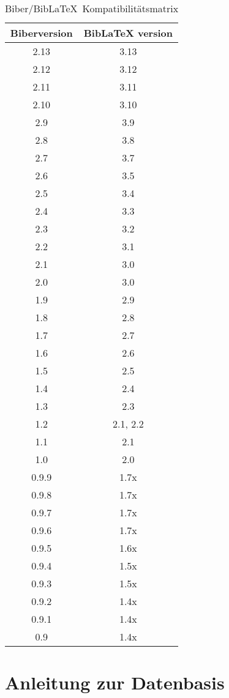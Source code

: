 \documentclass{ltxdockit}[2011/03/25]
\newcommand*{\biber}{Biber\xspace}
\newcommand*{\biblatex}{BibLaTeX\xspace}
\begin{document}
\begin{table}
\tablesetup\centering
\begin{tabular}{cc}
\toprule
\sffamily\bfseries\spotcolor Biberversion
  & \sffamily\bfseries\spotcolor \biblatex version\\
\midrule
2.13 & 3.13\\
2.12 & 3.12\\
2.11 & 3.11\\
2.10 & 3.10\\
2.9 & 3.9\\
2.8 & 3.8\\
2.7 & 3.7\\
2.6 & 3.5\\
2.5 & 3.4\\
2.4 & 3.3\\
2.3 & 3.2\\
2.2 & 3.1\\
2.1 & 3.0\\
2.0 & 3.0\\
1.9 & 2.9\\
1.8 & 2.8\\
1.7 & 2.7\\
1.6 & 2.6\\
1.5 & 2.5\\
1.4 & 2.4\\
1.3 & 2.3\\
1.2 & 2.1, 2.2\\
1.1 & 2.1\\
1.0 & 2.0\\
0.9.9 & 1.7x\\
0.9.8 & 1.7x\\
0.9.7 & 1.7x\\
0.9.6 & 1.7x\\
0.9.5 & 1.6x\\
0.9.4 & 1.5x\\
0.9.3 & 1.5x\\
0.9.2 & 1.4x\\
0.9.1 & 1.4x\\
0.9 & 1.4x\\
\bottomrule
\end{tabular}
\caption{\biber/\biblatex\ Kompatibilitätsmatrix}
\label{tab:int:pre:bibercompat}
\end{table}

\section{Anleitung zur Datenbasis} \label{bib} 
\end{document}
